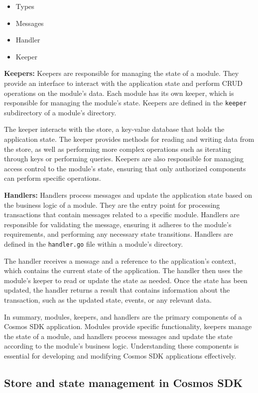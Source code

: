 \documentclass{article}
\begin{document}
\begin{itemize}
\item Types
\item Messages
\item Handler
\item Keeper
\end{itemize}

\textbf{Keepers:} Keepers are responsible for managing the state of a module. They provide an interface to interact with the application state and perform CRUD operations on the module's data. Each module has its own keeper, which is responsible for managing the module's state. Keepers are defined in the \texttt{keeper} subdirectory of a module's directory.

The keeper interacts with the store, a key-value database that holds the application state. The keeper provides methods for reading and writing data from the store, as well as performing more complex operations such as iterating through keys or performing queries. Keepers are also responsible for managing access control to the module's state, ensuring that only authorized components can perform specific operations.

\textbf{Handlers:} Handlers process messages and update the application state based on the business logic of a module. They are the entry point for processing transactions that contain messages related to a specific module. Handlers are responsible for validating the message, ensuring it adheres to the module's requirements, and performing any necessary state transitions. Handlers are defined in the \texttt{handler.go} file within a module's directory.

The handler receives a message and a reference to the application's context, which contains the current state of the application. The handler then uses the module's keeper to read or update the state as needed. Once the state has been updated, the handler returns a result that contains information about the transaction, such as the updated state, events, or any relevant data.

In summary, modules, keepers, and handlers are the primary components of a Cosmos SDK application. Modules provide specific functionality, keepers manage the state of a module, and handlers process messages and update the state according to the module's business logic. Understanding these components is essential for developing and modifying Cosmos SDK applications effectively.
\subsection{Store and state management in Cosmos SDK}
\end{document}
